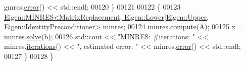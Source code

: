\begin{DoxyCode}
      gmres.\hyperlink{group___iterative_linear_solvers___module_a117c241af3fb1141ad0916a3cf3157ec}{error}() << std::endl;
00120   \}
00121 
00122   \{
00123     
      \hyperlink{group___iterative_linear_solvers___module_class_eigen_1_1_m_i_n_r_e_s}{Eigen::MINRES<MatrixReplacement, Eigen::Lower|Eigen::Upper, Eigen::IdentityPreconditioner>}
       minres;
00124     minres.\hyperlink{group___iterative_linear_solvers___module_a7dfa55c55e82d697bde227696a630914}{compute}(A);
00125     x = minres.\hyperlink{group___sparse_core___module_a4a66e9498b06e3ec4ec36f06b26d4e8f}{solve}(b);
00126     std::cout << \textcolor{stringliteral}{"MINRES:   #iterations: "} << minres.\hyperlink{group___iterative_linear_solvers___module_ae778dd098bd5e6655625b20b1e9f15da}{iterations}() << \textcolor{stringliteral}{", estimated error: "} << 
      minres.\hyperlink{group___iterative_linear_solvers___module_a117c241af3fb1141ad0916a3cf3157ec}{error}() << std::endl;
00127   \}
00128 \}
\end{DoxyCode}
